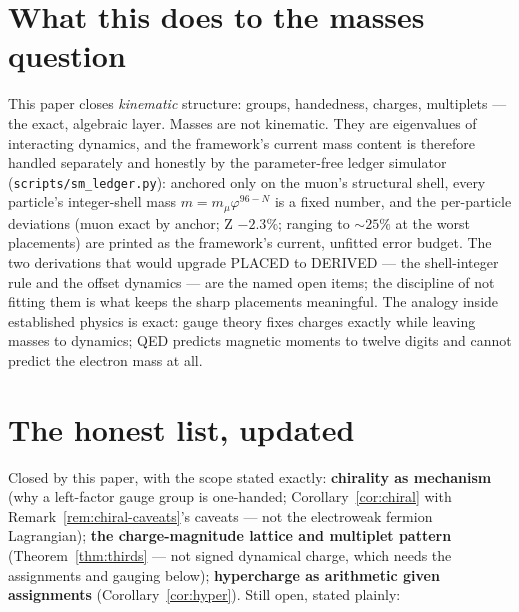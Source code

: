 \documentclass[12pt]{article}
\theoremstyle{definition}
\theoremstyle{remark}
\begin{document}
\section{What this does to the masses question}\label{sec:masses}

This paper closes \emph{kinematic} structure: groups, handedness, charges, multiplets --- the exact, algebraic layer. Masses are not kinematic. They are eigenvalues of interacting dynamics, and the framework's current mass content is therefore handled separately and honestly by the parameter-free ledger simulator (\texttt{scripts/sm\_ledger.py}): anchored only on the muon's structural shell, every particle's integer-shell mass $m = m_\mu\varphi^{96-N}$ is a fixed number, and the per-particle deviations (muon exact by anchor; Z $-2.3\%$; ranging to $\sim25\%$ at the worst placements) are printed as the framework's current, unfitted error budget. The two derivations that would upgrade PLACED to DERIVED --- the shell-integer rule and the offset dynamics --- are the named open items; the discipline of not fitting them is what keeps the sharp placements meaningful. The analogy inside established physics is exact: gauge theory fixes charges exactly while leaving masses to dynamics; QED predicts magnetic moments to twelve digits and cannot predict the electron mass at all.

\section{The honest list, updated}\label{sec:honest}

Closed by this paper, with the scope stated exactly: \textbf{chirality as mechanism} (why a left-factor gauge group is one-handed; Corollary~\ref{cor:chiral} with Remark~\ref{rem:chiral-caveats}'s caveats --- not the electroweak fermion Lagrangian); \textbf{the charge-magnitude lattice and multiplet pattern} (Theorem~\ref{thm:thirds} --- not signed dynamical charge, which needs the assignments and gauging below); \textbf{hypercharge as arithmetic given assignments} (Corollary~\ref{cor:hyper}). Still open, stated plainly:
\end{document}
